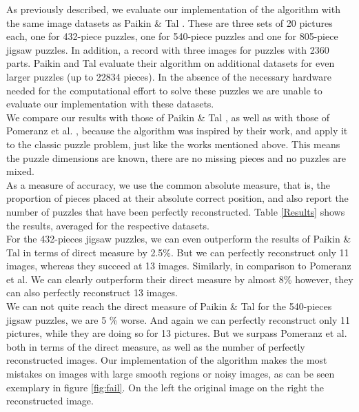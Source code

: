 \documentclass[]{report}
\begin{document}
As previously described, we evaluate our implementation of the algorithm with
the same image datasets as Paikin \& Tal \cite{Paikin2015}. These are three sets
of 20 pictures each, one for 432-piece puzzles, one for 540-piece puzzles and
one for 805-piece jigsaw puzzles. In addition, a record with three images for
puzzles with 2360 parts. Paikin and Tal evaluate their algorithm on additional
datasets for even larger puzzles (up to 22834 pieces). In the absence of the
necessary hardware needed for the computational effort to solve these puzzles we
are unable to evaluate our implementation with these datasets. \\
We compare our
results with those of Paikin \& Tal \cite{Paikin2015}, as well as with those of
Pomeranz et al. \cite{Pomeranz2011}, because the algorithm was inspired by their
work, and apply it to the classic puzzle problem, just like the works mentioned
above. This means the puzzle dimensions are known, there are no missing pieces
and no puzzles are mixed. \\
As a measure of accuracy, we use the common absolute measure, that is, the
proportion of pieces placed at their absolute correct position, and also report
the number of puzzles that have been perfectly reconstructed. Table
\ref{Results} shows the results, averaged for the respective datasets. \\
For the 432-pieces jigsaw puzzles, we can even outperform the results of Paikin \& Tal in
terms of direct measure by 2.5\%. But we can perfectly reconstruct only 11 images,
whereas they succeed at 13 images. Similarly, in comparison to Pomeranz et
al. We can clearly outperform their direct measure by almost 8\% however, they
can also perfectly reconstruct 13 images. \\
We can not quite reach the direct measure of Paikin \& Tal for the 540-pieces
jigsaw puzzles, we are 5 \% worse. And again we can perfectly reconstruct only 11
pictures, while they are doing so for 13 pictures. But we surpass Pomeranz et
al. both in terms of the direct measure, as well as the number of perfectly
reconstructed images. Our implementation of the algorithm makes the most
mistakes on images with large smooth regions or noisy images, as can be seen
exemplary in figure \ref{fig:fail}. On the left the original image on the right
the reconstructed image.
\end{document}
